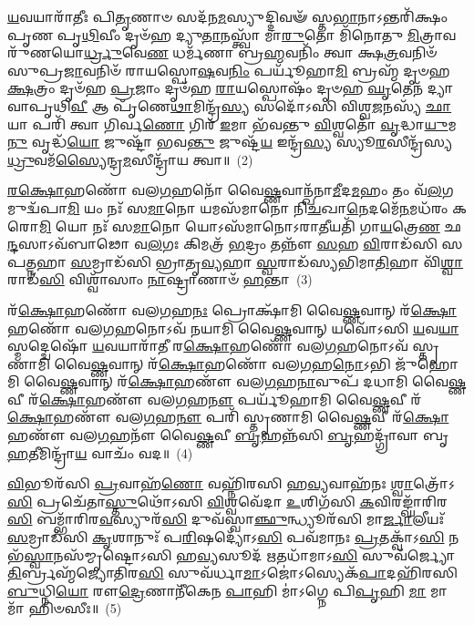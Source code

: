 \-\ul{𑌯}\-𑌵𑌯𑌾𑌰𑌾᳴𑌤𑍀𑌃 𑌪𑌿\-\ul{𑌤𑍃}\-𑌣𑌾𑍞 𑌸𑌦᳴𑌨\-\ul{𑌮}\-𑌸𑍍𑌯𑍁𑌦𑍍𑌦𑌿𑌵𑍟᳴ 𑌸𑍍𑌤\-\ul{𑌭𑌾}\-𑌨𑌾\-𑌽𑌨𑍍𑌤𑌰𑌿᳴𑌕𑍍𑌷𑌂 𑌪𑍃𑌣 𑌪𑍃\-\ul{𑌥𑌿}\-𑌵𑍀𑌂 𑌦𑍃𑍞᳴𑌹 𑌦𑍍𑌯𑍁\-\ul{𑌤𑌾}\-𑌨𑌸𑍍𑌤𑍍𑌵𑌾᳴ 𑌮𑌾\-\ul{𑌰𑍁}\-𑌤𑍋 𑌮𑌿᳴𑌨𑍋𑌤𑍁 \ul{𑌮𑌿}\-𑌤𑍍𑌰𑌾𑌵𑌰𑍁᳴𑌣𑌯𑍋\-\ul{𑌰𑍍𑌧𑍍𑌰𑍁}\-𑌵𑍇\-\ul{𑌣} 𑌧𑌰𑍍𑌮᳴𑌣𑌾 𑌬𑍍𑌰\-\ul{𑌹𑍍𑌮}\-𑌵𑌨𑌿𑌂᳴ 𑌤𑍍𑌵𑌾 𑌕𑍍𑌷\-\ul{𑌤𑍍𑌰}\-𑌵𑌨𑌿𑍞᳴ 𑌸𑍁𑌪𑍍𑌰\-\ul{𑌜𑌾}\-𑌵𑌨𑌿𑍞᳴ 𑌰𑌾𑌯𑌸𑍍𑌪𑍋\-\ul{𑌷}\-𑌵\-\ul{𑌨𑌿𑌂} 𑌪𑌰𑍍𑌯𑍂᳴𑌹𑌾\-\ul{𑌮𑌿} 𑌬𑍍𑌰𑌹𑍍𑌮᳴ 𑌦𑍃𑍞𑌹 \ul{𑌕𑍍𑌷}\-𑌤𑍍𑌰𑌂 𑌦𑍃𑍞᳴𑌹 \ul{𑌪𑍍𑌰}\-𑌜𑌾𑌂 𑌦𑍃𑍞᳴𑌹 \ul{𑌰𑌾}\-𑌯𑌸𑍍𑌪𑍋𑌷𑌂᳴ 𑌦𑍃𑍞𑌹 \ul{𑌘𑍃}\-𑌤𑍇𑌨᳴ 𑌦𑍍𑌯𑌾𑌵𑌾𑌪𑍃𑌥𑌿\-\ul{𑌵𑍀} 𑌆 𑌪𑍃᳴𑌣𑍇\-\ul{𑌥𑌾}\-𑌮𑌿𑌨𑍍𑌦𑍍𑌰᳴\-\ul{𑌸𑍍𑌯} 𑌸𑌦𑍋᳴\-𑌽𑌸𑌿 𑌵𑌿𑌶𑍍𑌵\-\ul{𑌜}\-𑌨𑌸𑍍𑌯᳴ \ul{𑌛𑌾}\-𑌯𑌾 𑌪𑌰𑌿᳴ 𑌤𑍍𑌵𑌾 𑌗𑌿𑌰𑍍𑌵\-\ul{𑌣𑍋} 𑌗𑌿𑌰᳴ \ul{𑌇}\-𑌮𑌾 𑌭᳴𑌵𑌨𑍍𑌤𑍁 \ul{𑌵𑌿}\-𑌶𑍍𑌵𑌤𑍋᳴ \ul{𑌵𑍃}\-𑌦𑍍𑌧𑌾\-\ul{𑌯𑍁}\-𑌮\-\ul{𑌨𑍁} 𑌵𑍃𑌦𑍍𑌧᳴\-\ul{𑌯𑍋} 𑌜𑍁𑌷𑍍𑌟𑌾᳴ 𑌭𑌵\-\ul{𑌨𑍍𑌤𑍁} 𑌜𑍁𑌷𑍍𑌟᳴\-\ul{𑌯} 𑌇𑌨𑍍𑌦𑍍𑌰᳴\-\ul{𑌸𑍍𑌯} 𑌸𑍍𑌯𑍂\-\ul{𑌰}\-𑌸𑍀𑌨𑍍𑌦𑍍𑌰᳴𑌸𑍍𑌯 \ul{𑌧𑍍𑌰𑍁}\-𑌵𑌮᳴\-\ul{𑌸𑍍𑌯𑍈}\-𑌨𑍍𑌦𑍍𑌰\-\ul{𑌮}\-𑌸𑍀𑌨𑍍𑌦𑍍𑌰𑌾᳴𑌯 𑌤𑍍𑌵𑌾॥~(2)

{\anuvakamend[{𑌦𑍍𑌵𑍇𑌷᳴ \ul{𑌇}\-𑌮𑌾 \ul{𑌅}\-𑌷𑍍𑌟𑌾𑌦᳴𑌶 𑌚}]}%

\-\ul{𑌰}\-\-\ul{𑌕𑍍𑌷𑍋}\-𑌹𑌣𑍋᳴ 𑌵𑌲\-\ul{𑌗}\-𑌹𑌨𑍋᳴ 𑌵𑍈\-\ul{𑌷𑍍𑌣}\-𑌵𑌾𑌨𑍍𑌖᳴𑌨𑌾\-\ul{𑌮𑍀}\-𑌦\-\ul{𑌮}\-𑌹𑌂 𑌤𑌂 𑌵᳴\-\ul{𑌲}\-𑌗𑌮𑍁𑌦𑍍𑌵᳴𑌪𑌾\-\ul{𑌮𑌿} 𑌯𑌂 𑌨𑌃᳴ 𑌸\-\ul{𑌮𑌾}\-𑌨𑍋 𑌯𑌮𑌸᳴𑌮𑌾𑌨𑍋 𑌨𑌿\-\ul{𑌚}\-𑌖𑌾\-\ul{𑌨𑍇}\-𑌦𑌮𑍇᳴\-\ul{𑌨}\-𑌮𑌧᳴𑌰𑌂 𑌕𑌰𑍋\-\ul{𑌮𑌿} 𑌯𑍋 𑌨𑌃᳴ 𑌸\-\ul{𑌮𑌾}\-𑌨𑍋 𑌯𑍋\-𑌽𑌸᳴𑌮𑌾𑌨𑍋\-𑌽𑌰𑌾\-\ul{𑌤𑍀}\-𑌯𑌤𑌿᳴ 𑌗𑌾\-\ul{𑌯}\-𑌤𑍍𑌰𑍇\-\ul{𑌣} 𑌛\-\ul{𑌨𑍍𑌦}\-𑌸𑌾\-𑌽𑌵᳴𑌬𑌾𑌢𑍋 𑌵\-\ul{𑌲}\-𑌗𑌃 𑌕𑌿𑌮𑌤𑍍𑌰᳴ \ul{𑌭}\-𑌦𑍍𑌰𑌂 𑌤𑌨𑍍𑌨𑍗᳴ \ul{𑌸}\-𑌹 \ul{𑌵𑌿}\-𑌰𑌾𑌡᳴𑌸𑌿 𑌸𑌪\-\ul{𑌤𑍍𑌨}\-𑌹𑌾 \ul{𑌸}\-𑌮𑍍𑌰𑌾𑌡᳴𑌸𑌿 𑌭𑍍𑌰𑌾𑌤𑍃\-\ul{𑌵𑍍𑌯}\-𑌹𑌾 \ul{𑌸𑍍𑌵}\-𑌰𑌾𑌡᳴𑌸𑍍𑌯𑌭𑌿𑌮𑌾\-\ul{𑌤𑌿}\-𑌹𑌾 𑌵𑌿᳴\-\ul{𑌶𑍍𑌵𑌾}\-𑌰𑌾𑌡᳴\-\ul{𑌸𑌿} 𑌵𑌿𑌶𑍍𑌵𑌾᳴𑌸𑌾𑌂 \ul{𑌨𑌾}\-𑌷𑍍𑌟𑍍𑌰𑌾𑌣𑌾𑍞᳴ \ul{𑌹}\-𑌨𑍍𑌤𑌾~(3)

𑌰᳴\-\ul{𑌕𑍍𑌷𑍋}\-𑌹𑌣𑍋᳴ 𑌵𑌲\-\ul{𑌗}\-𑌹\-\ul{𑌨𑌃} 𑌪𑍍𑌰𑍋𑌕𑍍𑌷𑌾᳴𑌮𑌿 𑌵𑍈\-\ul{𑌷𑍍𑌣}\-𑌵𑌾𑌨𑍍 𑌰᳴\-\ul{𑌕𑍍𑌷𑍋}\-𑌹𑌣𑍋᳴ 𑌵𑌲\-\ul{𑌗}\-𑌹𑌨𑍋\-𑌽𑌵᳴ 𑌨𑌯𑌾𑌮𑌿 𑌵𑍈\-\ul{𑌷𑍍𑌣}\-𑌵𑌾𑌨𑍍 𑌯𑌵𑍋᳴\-𑌽𑌸𑌿 \ul{𑌯}\-𑌵\-\ul{𑌯𑌾}\-𑌸𑍍𑌮𑌦𑍍𑌦𑍍𑌵𑍇𑌷𑍋᳴ \ul{𑌯}\-𑌵𑌯𑌾𑌰𑌾᳴𑌤𑍀 𑌰\-\ul{𑌕𑍍𑌷𑍋}\-𑌹𑌣𑍋᳴ 𑌵𑌲\-\ul{𑌗}\-𑌹𑌨𑍋\-𑌽𑌵᳴ 𑌸𑍍𑌤𑍃𑌣𑌾𑌮𑌿 𑌵𑍈\-\ul{𑌷𑍍𑌣}\-𑌵𑌾𑌨𑍍 𑌰᳴\-\ul{𑌕𑍍𑌷𑍋}\-𑌹𑌣𑍋᳴ 𑌵𑌲\-\ul{𑌗}\-𑌹\-\ul{𑌨𑍋}\-\-𑌽𑌭𑌿 𑌜𑍁᳴𑌹𑍋𑌮𑌿 𑌵𑍈\-\ul{𑌷𑍍𑌣}\-𑌵𑌾𑌨𑍍 𑌰᳴\-\ul{𑌕𑍍𑌷𑍋}\-𑌹𑌣𑍗᳴ 𑌵𑌲\-\ul{𑌗}\-𑌹\-\ul{𑌨𑌾}\-𑌵𑍁𑌪᳴ 𑌦𑌧𑌾𑌮𑌿 𑌵𑍈\-\ul{𑌷𑍍𑌣}\-𑌵𑍀 𑌰᳴\-\ul{𑌕𑍍𑌷𑍋}\-𑌹𑌣𑍗᳴ 𑌵𑌲\-\ul{𑌗}\-𑌹\-\ul{𑌨𑍗} 𑌪𑌰𑍍𑌯𑍂᳴𑌹𑌾𑌮𑌿 𑌵𑍈\-\ul{𑌷𑍍𑌣}\-𑌵𑍀 𑌰᳴\-\ul{𑌕𑍍𑌷𑍋}\-𑌹𑌣𑍗᳴ 𑌵𑌲\-\ul{𑌗}\-𑌹\-\ul{𑌨𑍗} 𑌪𑌰𑌿᳴ 𑌸𑍍𑌤𑍃𑌣𑌾𑌮𑌿 𑌵𑍈\-\ul{𑌷𑍍𑌣}\-𑌵𑍀 𑌰᳴\-\ul{𑌕𑍍𑌷𑍋}\-𑌹𑌣𑍗᳴ 𑌵𑌲\-\ul{𑌗}\-𑌹𑌨𑍗᳴ 𑌵𑍈\-\ul{𑌷𑍍𑌣}\-𑌵𑍀 \ul{𑌬𑍃}\-𑌹𑌨𑍍𑌨᳴𑌸𑌿 \ul{𑌬𑍃}\-𑌹𑌦𑍍𑌗𑍍𑌰𑌾᳴𑌵𑌾 𑌬𑍃\-\ul{𑌹}\-𑌤𑍀𑌮𑌿𑌨𑍍𑌦𑍍𑌰𑌾᳴\-\ul{𑌯} 𑌵𑌾𑌚𑌂᳴ 𑌵𑌦॥~(4)

{\anuvakamend[{\-\ul{𑌹}\-𑌨𑍍𑌤𑍇𑌨𑍍𑌦𑍍𑌰𑌾᳴\-\ul{𑌯} 𑌦𑍍𑌵𑍇 𑌚᳴}]}%

\-\ul{𑌵𑌿}\-𑌭𑍂𑌰᳴𑌸𑌿 \ul{𑌪𑍍𑌰}\-𑌵𑌾𑌹᳴\-\ul{𑌣𑍋} 𑌵𑌹𑍍𑌨𑌿᳴𑌰𑌸𑌿 𑌹\-\ul{𑌵𑍍𑌯}\-𑌵𑌾𑌹᳴𑌨𑌃 \ul{𑌶𑍍𑌵𑌾}\-𑌤𑍍𑌰𑍋᳴\-𑌽\-\ul{𑌸𑌿} 𑌪𑍍𑌰𑌚𑍇᳴𑌤𑌾\-\ul{𑌸𑍍𑌤𑍁}\-𑌥𑍋᳴\-𑌽𑌸𑌿 \ul{𑌵𑌿}\-𑌶𑍍𑌵𑌵𑍇᳴𑌦𑌾 \ul{𑌉}\-𑌶𑌿𑌗᳴𑌸𑌿 \ul{𑌕}\-𑌵𑌿𑌰𑌙𑍍𑌘𑌾᳴𑌰𑌿𑌰\-\ul{𑌸𑌿} 𑌬𑌮𑍍𑌭𑌾᳴𑌰𑌿𑌰\-\ul{𑌵}\-𑌸𑍍𑌯𑍁𑌰᳴\-\ul{𑌸𑌿} 𑌦𑍁𑌵᳴𑌸𑍍𑌵𑌾\-\ul{𑌞𑍍𑌛𑍁}\-𑌨𑍍𑌧𑍍𑌯𑍂𑌰᳴𑌸𑌿 𑌮𑌾\-\ul{𑌰𑍍𑌜𑌾}\-𑌲𑍀𑌯𑌃᳴ \ul{𑌸}\-𑌮𑍍𑌰𑌾𑌡᳴𑌸𑌿 \ul{𑌕𑍃}\-𑌶𑌾𑌨𑍁𑌃᳴ 𑌪\-\ul{𑌰𑌿}\-𑌷𑌦𑍍𑌯𑍋᳴\-𑌽\-\ul{𑌸𑌿} 𑌪𑌵᳴𑌮𑌾𑌨𑌃 \ul{𑌪𑍍𑌰}\-𑌤𑌕𑍍𑌵𑌾᳴\-𑌽\-\ul{𑌸𑌿} 𑌨𑌭᳴\-\ul{𑌸𑍍𑌵𑌾}\-𑌨𑌸᳴𑌮𑍍𑌮𑍃𑌷𑍍𑌟𑍋\-𑌽𑌸𑌿 𑌹\-\ul{𑌵𑍍𑌯}\-𑌸𑍂𑌦᳴ \ul{𑌋}\-𑌤𑌧𑌾᳴𑌮𑌾\-𑌽\-\ul{𑌸𑌿} 𑌸𑍁𑌵᳴𑌰𑍍𑌜𑍍𑌯𑍋\-\ul{𑌤𑌿}\-𑌰𑍍𑌬𑍍𑌰𑌹𑍍𑌮᳴𑌜𑍍𑌯𑍋𑌤𑌿𑌰\-\ul{𑌸𑌿} 𑌸𑍁𑌵᳴𑌰𑍍𑌧𑌾\-\ul{𑌮𑌾}\-\-𑌽𑌜𑍋॑\-𑌽𑌸𑍍𑌯𑍇𑌕᳴\-\ul{𑌪𑌾}\-𑌦𑌹𑌿᳴𑌰𑌸𑌿 \ul{𑌬𑍁}\-𑌧𑍍𑌨𑌿\-\ul{𑌯𑍋} 𑌰𑍗\-\ul{𑌦𑍍𑌰𑍇}\-𑌣𑌾𑌨𑍀᳴𑌕𑍇𑌨 \ul{𑌪𑌾}\-𑌹𑌿 𑌮𑌾॑\-𑌽𑌗𑍍𑌨𑍇 𑌪𑌿\-\ul{𑌪𑍃}\-𑌹𑌿 \ul{𑌮𑌾} 𑌮𑌾 𑌮𑌾᳴ 𑌹𑌿𑍞𑌸𑍀𑌃॥~(5)

